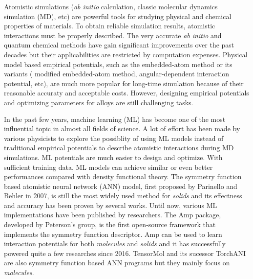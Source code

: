 \documentclass[preprint]{revtex4-2}
\begin{document}
Atomistic simulations (\textit{ab initio} calculation, classic molecular 
dynamics simulation (MD), etc) are powerful tools for studying physical and 
chemical properties of materials. To obtain reliable simulation results, 
atomistic interactions must be properly described. The very accurate 
\textit{ab initio} and quantum chemical methods have gain significant 
improvements over the past decades but their applicabilities are restricted by 
computation expenses. Physical model based empirical potentials, such as the 
embedded-atom method\cite{eam-1,eam-2,eam-3,eam-4,eam-5} or its variants (
modified embedded-atom method\cite{eam-5,meam-1,meam-2,meam-3}, 
angular-dependent interaction potential\cite{adp-1,adp-2,adp-3}, etc), are much 
more popular for long-time simulation because of their reasonable accuraty and 
acceptable costs. 
However, designing empirical potentials and optimizing parameters for 
alloys are still challenging tasks\cite{eam-5, adp-2, SNAP_2018}. 

In the past few years, machine learning (ML) has become one of the most 
influential topic in almost all fields of science. A lot of effort has been made 
by various physicists to explore the possiblity of using ML models \textemdash 
instead of traditional empirical potentials \textemdash to describe atomistic 
interactions during MD simulations\cite{kCON,SchNet,DTNN,SNAP_2018,SNAP_Mo_2017,
ANI,TensorMol}. ML potentials are much easier to design and 
optimize. With sufficient training data, ML models can achieve similar or even 
better performances compared with density functional theory.
The symmetry function based atomistic neural network (ANN) model, first proposed 
by Parinello and Behler in 2007\cite{Behler,Behler2,Behler3,Behler4,Behler1}, 
is still the most widely used method for \textit{solids} and its effectness and 
accuracy has been proven by several 
works\cite{Behler-solids-lzp-1,Behler-alloy-1,Behler-alloy-2, Behler-alloy-3}.
Until now, various ML implementations\cite{AMP,ANI,TensorMol} have been 
published by researchers. The Amp\cite{AMP} package, developed by Peterson's 
group, is the first open-source framework that implements the symmetry function 
descriptor. Amp can be used to learn interaction potentials for both 
\textit{molecules} and \textit{solids} and it has successfully powered quite a 
few researches since 2016\cite{Amp-works-hammer,amp-work-1}. 
TensorMol\cite{TensorMol} and its sucessor TorchANI\cite{ANI} are also symmetry 
function based ANN programs but they mainly focus on \textit{molecules}. 
\end{document}
